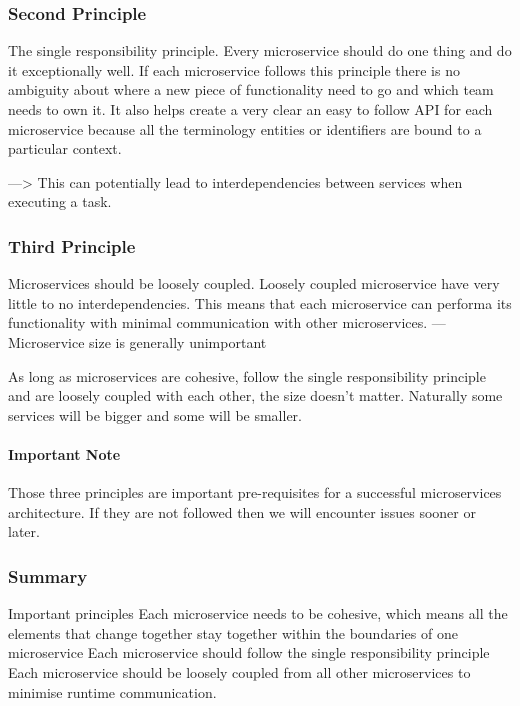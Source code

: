 \documentclass[a4paper, 11pt]{book}
\begin{document}
    \subsubsection{Second Principle}
    The single responsibility principle.
    Every microservice should do one thing and do it exceptionally well.
    If each microservice follows this principle there is no ambiguity about where a new piece of functionality need to go and which team needs to own it.
    It also helps create a very clear an easy to follow API for each microservice because all the terminology entities or identifiers are bound to a particular context.

    ---> This can potentially lead to interdependencies between services when executing a task.

    \subsubsection{Third Principle}
    Microservices should be loosely coupled.
    Loosely coupled microservice have very little to no interdependencies.
    This means that each microservice can performa its functionality with minimal communication with other microservices.
    --- Microservice size is generally unimportant

    As long as microservices are cohesive, follow the single responsibility principle and are loosely coupled with each other, the size doesn't matter.
    Naturally some services will be bigger and some will be smaller.

    \paragraph{Important Note}
    Those three principles are important pre-requisites for a successful microservices architecture.
    If they are not followed then we will encounter issues sooner or later.

    \subsubsection{Summary}
    Important principles
    Each microservice needs to be cohesive, which means all the elements that change together stay together within the boundaries of one microservice
    Each microservice should follow the single responsibility principle
    Each microservice should be loosely coupled from all other microservices to minimise runtime communication.
\end{document}
